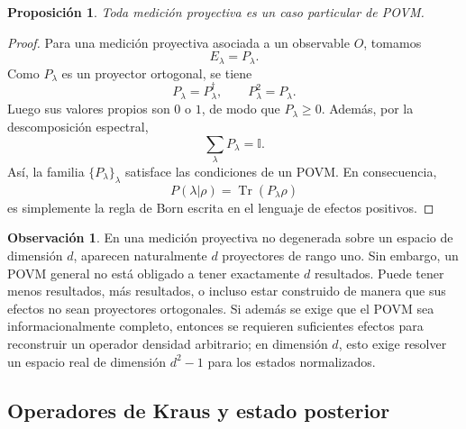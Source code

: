 \documentclass[12pt,a4paper]{article}
\theoremstyle{definition}
\newtheorem{observacion}[definicion]{Observación}
\theoremstyle{plain}
\newtheorem{proposicion}[definicion]{Proposición}
\theoremstyle{remark}
\newcommand{\I}{\mathbb{I}}
\begin{document}
\begin{proposicion}
Toda medición proyectiva es un caso particular de POVM.
\end{proposicion}

\begin{proof}
Para una medición proyectiva asociada a un observable $O$, tomamos
\begin{equation*}
    E_\lambda=P_\lambda.
\end{equation*}
Como $P_\lambda$ es un proyector ortogonal, se tiene
\begin{equation*}
    P_\lambda=P_\lambda^\dagger,
    \qquad
    P_\lambda^2=P_\lambda.
\end{equation*}
Luego sus valores propios son $0$ o $1$, de modo que $P_\lambda\geq0$. Además, por la descomposición espectral,
\begin{equation*}
    \sum_\lambda P_\lambda=\I.
\end{equation*}
Así, la familia $\{P_\lambda\}_\lambda$ satisface las condiciones de un POVM. En consecuencia,
\begin{equation*}
    P(\lambda|\rho)=\operatorname{Tr}(P_\lambda\rho)
\end{equation*}
es simplemente la regla de Born escrita en el lenguaje de efectos positivos.
\end{proof}

\begin{observacion}
En una medición proyectiva no degenerada sobre un espacio de dimensión $d$, aparecen naturalmente $d$ proyectores de rango uno. Sin embargo, un POVM general no está obligado a tener exactamente $d$ resultados. Puede tener menos resultados, más resultados, o incluso estar construido de manera que sus efectos no sean proyectores ortogonales. Si además se exige que el POVM sea informacionalmente completo, entonces se requieren suficientes efectos para reconstruir un operador densidad arbitrario; en dimensión $d$, esto exige resolver un espacio real de dimensión $d^2-1$ para los estados normalizados.
\end{observacion}

\subsection{Operadores de Kraus y estado posterior}
\end{document}
